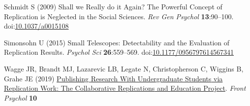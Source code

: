 \documentclass[
  english,
  a4paper,
]{article}
\newlength{\cslhangindent}
\newlength{\cslentryspacingunit} %
\newenvironment{CSLReferences}[2] %
 {%
  \setlength{\parindent}{0pt}
  \ifodd #1
  \let\oldpar\par
  \def\par{\hangindent=\cslhangindent\oldpar}
  \fi
  \setlength{\parskip}{#2\cslentryspacingunit}
 }%
 {}
\begin{document}
\begin{CSLReferences}{1}{0}
\leavevmode{}%
Schmidt S (2009) Shall we {Really} do it {Again}? {The Powerful Concept} of {Replication} is {Neglected} in the {Social Sciences}. \emph{Rev Gen Psychol} \textbf{13}:90--100. doi:\href{https://doi.org/10.1037/a0015108}{10.1037/a0015108}

\leavevmode{}%
Simonsohn U (2015) Small {Telescopes}: {Detectability} and the {Evaluation} of {Replication Results}. \emph{Psychol Sci} \textbf{26}:559--569. doi:\href{https://doi.org/10.1177/0956797614567341}{10.1177/0956797614567341}

\leavevmode{}%
Wagge JR, Brandt MJ, Lazarevic LB, Legate N, Christopherson C, Wiggins B, Grahe JE (2019) \href{https://www.frontiersin.org/articles/10.3389/fpsyg.2019.00247}{Publishing {Research With Undergraduate Students} via {Replication Work}: {The Collaborative Replications} and {Education Project}}. \emph{Front Psychol} \textbf{10}

\end{CSLReferences}
\end{document}
